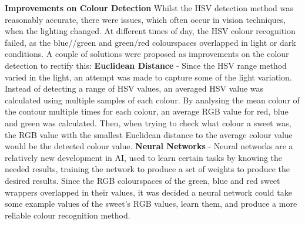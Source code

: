 \newline\newline
\textbf{Improvements on Colour Detection}
\newline\newline
Whilst the HSV detection method was reasonably accurate, there were issues, which often occur in vision techniques, when the lighting changed. At different times of day, the HSV colour recognition failed, as the blue//green and green/red colourspaces overlapped in light or dark conditions. A couple of solutions were proposed as improvements on the colour detection to rectify this:
\newline\newline
\textbf{Euclidean Distance} - Since the HSV range method varied in the light, an attempt was made to capture some of the light variation. Instead of detecting a range of HSV values, an averaged HSV value was calculated using multiple samples of each colour. By analysing the mean colour of the contour multiple times for each colour, an average RGB value for red, blue and green was calculated. Then, when trying to check what colour a sweet was, the RGB value with the smallest Euclidean distance to the average colour value would be the detected colour value.
\newline\newline
\textbf{Neural Networks} - Neural networks are a relatively new development in AI, used to learn certain tasks by knowing the needed results, training the network to produce a set of weights to produce the desired results. Since the RGB colourspaces of the green, blue and red sweet wrappers overlapped in their values, it was decided a neural network could take some example values of the sweet's RGB values, learn them, and produce a more reliable colour recognition method.
